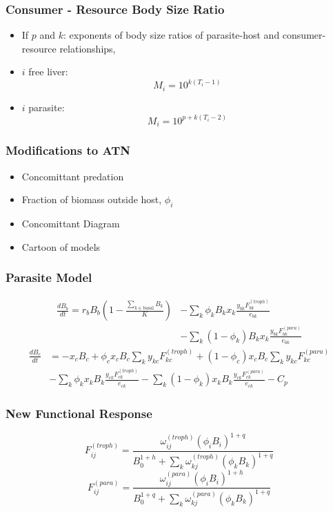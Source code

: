 \documentclass[table]{beamer}
\begin{document}
\begin{frame}
\frametitle{Consumer - Resource Body Size Ratio}
\begin{itemize}[<+->]
\item If $p$ and $k$: exponents of body size ratios of parasite-host and
    consumer-resource relationships,
\item $i$ free liver:
\[
M_i = 10^{k(T_i-1)}
\]
\item $i$ parasite:
\[
M_i = 10^{p + k(T_i-2)}
\]
\end{itemize}
\end{frame}

\begin{frame}
    \frametitle{Modifications to ATN}
    \begin{itemize}[<+->]
        \item Concomittant predation
        \item Fraction of biomass outside host, $\phi_i$
        \item \color{red} Concomittant Diagram
        \item \color{red}Cartoon of models
    \end{itemize}
\end{frame}

\begin{frame}
    \frametitle{Parasite Model}
    \begin{align*}
        \frac{dB_{b}}{dt} =
        r_bB_b\left(1-\frac{\sum_{k\in\text{basal}}B_k}{K}\right) &-
        \sum_k\phi_kB_kx_k\frac{y_{bk}^{}F_{bk}^{(troph)}}{e_{bk}}\\ & - \sum_k(1-\phi_k)B_kx_k\frac{y_{bk}^{}F^{(para)}_{bk}}{e_{bk}}
    \end{align*}
    \begin{align*}
        \frac{dB_{c}}{dt} &= -x_cB_c + \phi_cx_cB_c\sum_ky_{kc}^{ }F^{(troph)}_{kc} + (1-\phi_c)x_cB_c\sum_ky_{kc}^{ }F^{(para)}_{kc}\\ 
        & - \sum_k \phi_kx_kB_k\frac{y_{ck}^{}F^{(troph)}_{ck}}{e_{ck}} -
        \sum_k (1-\phi_k)x_kB_k\frac{y_{ck}^{}F^{(para)}_{ck}}{e_{ck}} - C_p
    \end{align*}
\end{frame}

\begin{frame}
    \frametitle{New Functional Response}
    \[
        F_{ij}^{(troph)} = \frac{\omega_{ij}^{(troph)}(\phi_iB_i)^{1+q}}{B_0^{1+h} + \sum_k\omega^{(troph)}_{kj}(\phi_kB_k)^{1+q}} \label{subeq:fr1troph}
    \]
    \[
        F_{ij}^{(para)} = \frac{\omega_{ij}^{(para)}(\phi_iB_i)^{1+h}}{B_0^{1+q} + \sum_k\omega^{(para)}_{kj}(\phi_kB_k)^{1+q}} 
    \]
\end{frame}
\end{document}

